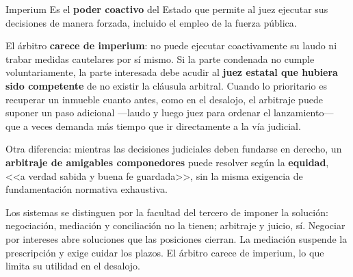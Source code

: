 \documentclass[12pt,oneside]{book}
\begin{document}
\begin{definition}{Imperium}
Es el \textbf{poder coactivo} del Estado que permite al juez ejecutar sus decisiones de manera forzada, incluido el empleo de la fuerza pública.
\end{definition}

\begin{important}
El árbitro \textbf{carece de imperium}: no puede ejecutar coactivamente su laudo ni trabar medidas cautelares por sí mismo. Si la parte condenada no cumple voluntariamente, la parte interesada debe acudir al \textbf{juez estatal que hubiera sido competente} de no existir la cláusula arbitral. Cuando lo prioritario es recuperar un inmueble cuanto antes, como en el desalojo, el arbitraje puede suponer un paso adicional ---laudo y luego juez para ordenar el lanzamiento--- que a veces demanda más tiempo que ir directamente a la vía judicial.
\end{important}

Otra diferencia: mientras las decisiones judiciales deben fundarse en derecho, un \textbf{arbitraje de amigables componedores} puede resolver según la \textbf{equidad}, <<a verdad sabida y buena fe guardada>>, sin la misma exigencia de fundamentación normativa exhaustiva.

\begin{sintesis}
Los sistemas se distinguen por la facultad del tercero de imponer la solución: negociación, mediación y conciliación no la tienen; arbitraje y juicio, sí. Negociar por intereses abre soluciones que las posiciones cierran. La mediación suspende la prescripción y exige cuidar los plazos. El árbitro carece de imperium, lo que limita su utilidad en el desalojo.
\end{sintesis}
\end{document}
